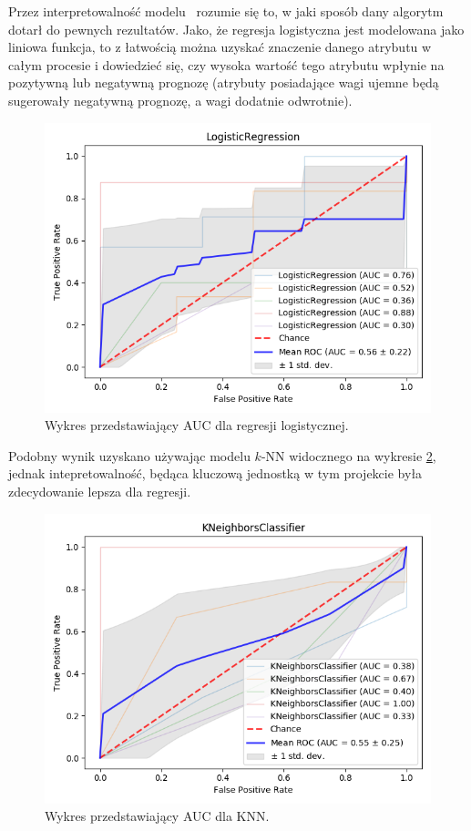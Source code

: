 \documentclass[a4paper,twoside,12pt]{book}
\begin{document}
Przez interpretowalność modelu~\cite{interpr} rozumie się to, w jaki sposób dany algorytm dotarł do pewnych rezultatów. Jako, że regresja logistyczna jest modelowana jako liniowa funkcja, to z łatwością można uzyskać znaczenie danego atrybutu w całym procesie i dowiedzieć się, czy wysoka wartość tego atrybutu wpłynie na pozytywną lub negatywną prognozę (atrybuty posiadające wagi ujemne będą sugerowały negatywną prognozę, a wagi dodatnie odwrotnie). 

\begin{figure}[h!]
    \centering
    \includegraphics[width=\textwidth]{images/logistic_regression.png}
    \caption{Wykres przedstawiający AUC dla regresji logistycznej.}
    \label{fig:plot_logit}
\end{figure}

Podobny wynik uzyskano używając modelu $k$-NN widocznego na wykresie \ref{fig:plot_knn}, jednak intepretowalność, będąca kluczową jednostką w tym projekcie była zdecydowanie lepsza dla regresji. 
\begin{figure}[h!]
    \centering
    \includegraphics[width=\textwidth]{images/knn.png}
    \caption{Wykres przedstawiający AUC dla KNN.}
    \label{fig:plot_knn}
\end{figure}
\end{document}
